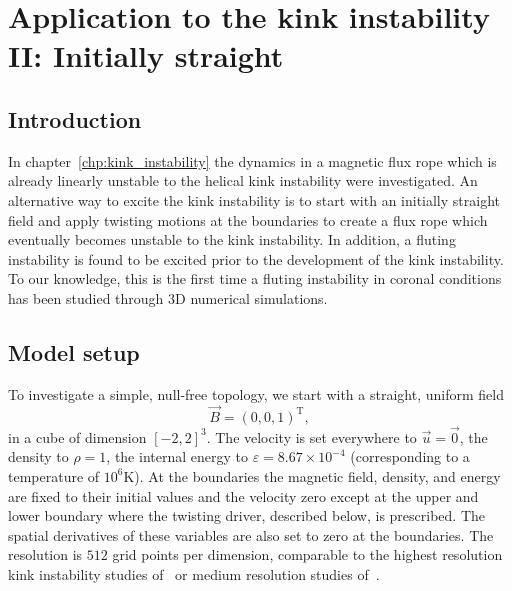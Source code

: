 \chapter{Application to the kink instability II: Initially straight}

\label{chp:kink_instability_straight}

\graphicspath{{images/kink_instability_straight/}}

\section{Introduction}

In chapter~\ref{chp:kink_instability} the dynamics in a magnetic flux rope which is already linearly unstable to the helical kink instability were investigated. An alternative way to excite the kink instability is to start with an initially straight field and apply twisting motions at the boundaries to create a flux rope which eventually becomes unstable to the kink instability. In addition, a fluting instability is found to be excited prior to the development of the kink instability. To our knowledge, this is the first time a fluting instability in coronal conditions has been studied through 3D numerical simulations. 



\section{Model setup}

To investigate a simple, null-free topology, we start with a straight, uniform field
\begin{equation}
\vec{B} = (0, 0, 1)^{\text{T}},
\end{equation}
in a cube of dimension $[-2,2]^3$. The velocity is set everywhere to $\vec{u} = \vec{0}$, the density to $\rho = 1$, the internal energy to $\varepsilon = 8.67\times 10^{-4}$ (corresponding to a temperature of $10^6$K). At the boundaries the magnetic field, density, and energy are fixed to their initial values and the velocity zero except at the upper and lower boundary where the twisting driver, described below, is prescribed. The spatial derivatives of these variables are also set to zero at the boundaries. The resolution is $512$ grid points per dimension, comparable to the highest resolution kink instability studies of~\cite{hoodCoronalHeatingMagnetic2009} or medium resolution studies of~\cite{barefordShockHeatingNumerical2015}.

